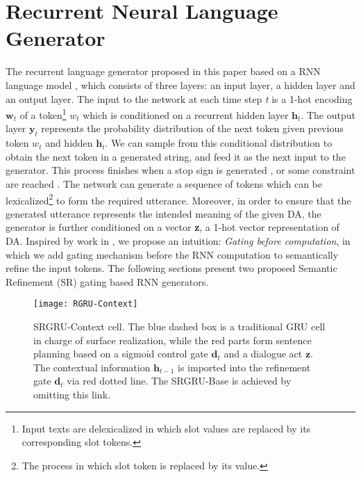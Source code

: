 \documentclass{llncs}
\begin{document}
\section{Recurrent Neural Language Generator}\label{sec:method}
The recurrent language generator proposed in this paper based on a RNN language model \cite{mikolov2010recurrent}, which consists of three layers: an input layer, a hidden layer and an output layer. The input to the network at each time step \textit{t} is a 1-hot encoding $\textbf{w}_{t}$ of a token\footnote{Input texts are delexicalized in which slot values are replaced by its corresponding slot tokens.} $w_{t}$ which is conditioned on a recurrent hidden layer $\textbf{h}_{t}$. The output layer $\textbf{y}_{t}$ represents the probability distribution of the next token given previous token $w_{t}$ and hidden $\textbf{h}_{t}$. We can sample from this conditional distribution to obtain the next token in a generated string, and feed it as the next input to the generator. This process finishes when a stop sign is generated \cite{karpathy2015deep}, or some constraint are reached \cite{zhang2014chinese}. The network can generate a sequence of tokens which can be lexicalized\footnote{The process in which slot token is replaced by its value.} to form the required utterance. Moreover, in order to ensure that the generated utterance represents the intended meaning of the given DA, the generator is further conditioned on a vector \textbf{z}, a 1-hot vector representation of DA. Inspired by work in \cite{wang2016inner}, we propose an intuition: \textit{Gating before computation}, in which we add gating mechanism before the RNN computation to semantically refine the input tokens. The following sections present two proposed Semantic Refinement (SR) gating based RNN generators.
\begin{figure}[!ht]
	\centering
    \texttt{[image: RGRU-Context]}
    \caption{SRGRU-Context cell. The blue dashed box is a traditional GRU cell in charge of surface realization, while the red parts form sentence planning based on a sigmoid control gate $\textbf{d}_{t}$ and a dialogue act $\textbf{z}$. The contextual information $\textbf{h}_{t-1}$ is imported into the refinement gate $\textbf{d}_{t}$ via red dotted line. The SRGRU-Base is achieved by omitting this link.}
    \label{fig:SRGRU-Model}
\end{figure}
\end{document}
